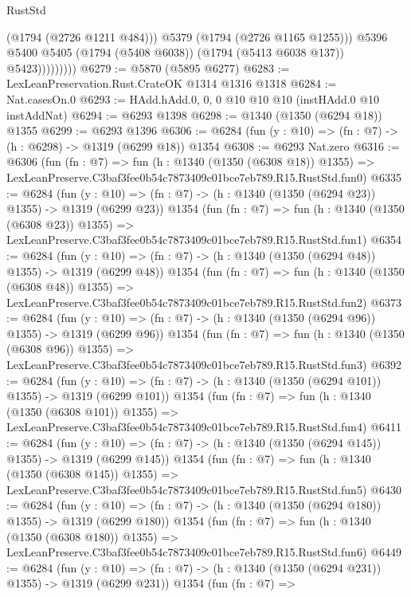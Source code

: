 \begin{lexlean}{RustStd}
\begin{coremodule}
                          (@1794 (@2726 @1211 @484)))
                        @5379
                        (@1794 (@2726 @1165 @1255)))
                      @5396
                      @5400
                      @5405
                      (@1794 (@5408 @6038))
                      (@1794 (@5413 @6038 @137))
                      @5423)))))))))
@6279 := @5870 (@5895 @6277)
@6283 := LexLeanPreservation.Rust.CrateOK @1314 @1316 @1318
@6284 := Nat.casesOn.{0}
@6293 := HAdd.hAdd.{0, 0, 0} @10 @10 @10 (instHAdd.{0} @10 instAddNat)
@6294 := @6293 @1398
@6298 := @1340 (@1350 (@6294 @18)) @1355
@6299 := @6293 @1396
@6306 := @6284 (fun (y : @10) => (fn : @7) -> (h : @6298) -> @1319 (@6299 @18)) @1354
@6308 := @6293 Nat.zero
@6316 := @6306
    (fun (fn : @7) =>
    fun (h : @1340 (@1350 (@6308 @18)) @1355) =>
    LexLeanPreserve.C3baf3fee0b54c7873409c01bce7eb789.R15.RustStd.fun0)
@6335 := @6284
    (fun (y : @10) => (fn : @7) -> (h : @1340 (@1350 (@6294 @23)) @1355) -> @1319 (@6299 @23))
    @1354
    (fun (fn : @7) =>
    fun (h : @1340 (@1350 (@6308 @23)) @1355) =>
    LexLeanPreserve.C3baf3fee0b54c7873409c01bce7eb789.R15.RustStd.fun1)
@6354 := @6284
    (fun (y : @10) => (fn : @7) -> (h : @1340 (@1350 (@6294 @48)) @1355) -> @1319 (@6299 @48))
    @1354
    (fun (fn : @7) =>
    fun (h : @1340 (@1350 (@6308 @48)) @1355) =>
    LexLeanPreserve.C3baf3fee0b54c7873409c01bce7eb789.R15.RustStd.fun2)
@6373 := @6284
    (fun (y : @10) => (fn : @7) -> (h : @1340 (@1350 (@6294 @96)) @1355) -> @1319 (@6299 @96))
    @1354
    (fun (fn : @7) =>
    fun (h : @1340 (@1350 (@6308 @96)) @1355) =>
    LexLeanPreserve.C3baf3fee0b54c7873409c01bce7eb789.R15.RustStd.fun3)
@6392 := @6284
    (fun (y : @10) => (fn : @7) -> (h : @1340 (@1350 (@6294 @101)) @1355) -> @1319 (@6299 @101))
    @1354
    (fun (fn : @7) =>
    fun (h : @1340 (@1350 (@6308 @101)) @1355) =>
    LexLeanPreserve.C3baf3fee0b54c7873409c01bce7eb789.R15.RustStd.fun4)
@6411 := @6284
    (fun (y : @10) => (fn : @7) -> (h : @1340 (@1350 (@6294 @145)) @1355) -> @1319 (@6299 @145))
    @1354
    (fun (fn : @7) =>
    fun (h : @1340 (@1350 (@6308 @145)) @1355) =>
    LexLeanPreserve.C3baf3fee0b54c7873409c01bce7eb789.R15.RustStd.fun5)
@6430 := @6284
    (fun (y : @10) => (fn : @7) -> (h : @1340 (@1350 (@6294 @180)) @1355) -> @1319 (@6299 @180))
    @1354
    (fun (fn : @7) =>
    fun (h : @1340 (@1350 (@6308 @180)) @1355) =>
    LexLeanPreserve.C3baf3fee0b54c7873409c01bce7eb789.R15.RustStd.fun6)
@6449 := @6284
    (fun (y : @10) => (fn : @7) -> (h : @1340 (@1350 (@6294 @231)) @1355) -> @1319 (@6299 @231))
    @1354
    (fun (fn : @7) =>

\end{coremodule}
\end{lexlean}
